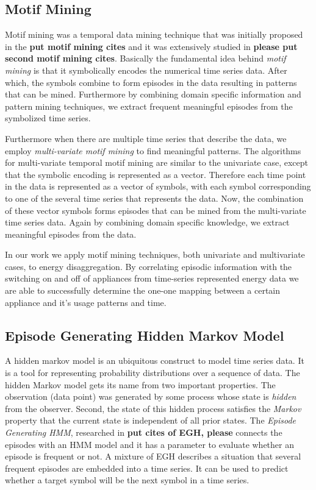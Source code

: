 \subsection{Motif Mining}
Motif mining was a temporal data mining technique that was initially proposed in the \textbf{put motif mining cites} and it was extensively studied in \textbf{please put second motif mining cites}. Basically the fundamental idea behind \emph{motif mining} is that it symbolically encodes the numerical time series data. After which, the symbols combine to form episodes in the data resulting in patterns that can be mined. Furthermore by combining domain specific information and pattern mining techniques, we extract frequent meaningful episodes from the symbolized time series.

Furthermore when there are multiple time series that describe the data, we employ \emph{multi-variate motif mining} to find meaningful patterns. The algorithms for multi-variate temporal motif mining are similar to the univariate case, except that the symbolic encoding is represented as a vector. Therefore each time point in the data is represented as a vector of symbols, with each symbol corresponding to one of the several time series that represents the data. Now, the combination of these vector symbols forms episodes that can be mined from the multi-variate time series data. Again by combining domain specific knowledge, we extract meaningful episodes from the data.

In our work we apply motif mining techniques, both univariate and multivariate cases, to energy disaggregation. By correlating episodic information with the switching on and off of appliances from time-series represented energy data we are able to successfully determine the one-one mapping between a certain appliance and it's usage patterns and time.

\subsection{Episode Generating Hidden Markov Model} A hidden markov model is an ubiquitous construct to model time series data. It is a tool for representing probability distributions over a sequence of data. The hidden Markov model gets its name from two important properties. The observation (data point) was generated by some process whose state is \emph{hidden} from the observer. Second, the state of this hidden process satisfies the \emph{Markov} property that the current state is independent of all prior states. The \emph{Episode Generating HMM}, researched in \textbf{put cites of EGH, please} connects the episodes with an HMM model and it has a parameter to evaluate whether an episode is frequent or not. A mixture of EGH describes a situation that several frequent episodes are embedded into a time series. It can be used to predict whether a target symbol will be the next symbol in a time series.

